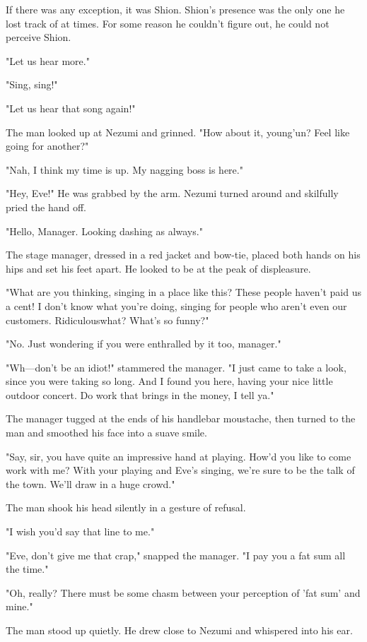 If there was any exception, it was Shion. Shion's presence was the only
one he lost track of at times. For some reason he couldn't figure out,
he could not perceive Shion.

"Let us hear more."

"Sing, sing!"

"Let us hear that song again!"

The man looked up at Nezumi and grinned. "How about it, young'un? Feel
like going for another?"

"Nah, I think my time is up. My nagging boss is here."

"Hey, Eve!" He was grabbed by the arm. Nezumi turned around and
skilfully pried the hand off.

"Hello, Manager. Looking dashing as always."

The stage manager, dressed in a red jacket and bow-tie, placed both
hands on his hips and set his feet apart. He looked to be at the peak of
displeasure.

"What are you thinking, singing in a place like this? These people
haven't paid us a cent! I don't know what you're doing, singing for
people who aren't even our customers. Ridiculous\el what? What's so
funny?"

"No. Just wondering if you were enthralled by it too, manager."

"Wh---don't be an idiot!" stammered the manager. "I just came to take a
look, since you were taking so long. And I found you here, having your
nice little outdoor concert. Do work that brings in the money, I tell
ya."

The manager tugged at the ends of his handlebar moustache, then turned
to the man and smoothed his face into a suave smile.

"Say, sir, you have quite an impressive hand at playing. How'd you like
to come work with me? With your playing and Eve's singing, we're sure to
be the talk of the town. We'll draw in a huge crowd."

The man shook his head silently in a gesture of refusal.

"I wish you'd say that line to me."

"Eve, don't give me that crap," snapped the manager. "I pay you a fat
sum all the time."

"Oh, really? There must be some chasm between your perception of 'fat
sum' and mine."

The man stood up quietly. He drew close to Nezumi and whispered into his
ear.

